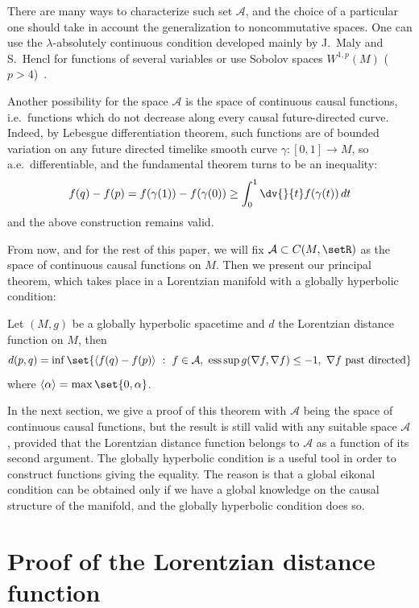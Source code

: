 There are many ways to characterize such set $\mathcal A$, and the choice of a particular one should take in account the generalization to noncommutative spaces. One can use the $\lambda$-absolutely continuous condition developed mainly by J.~Maly and S.~Hencl for functions of several variables or use Sobolov spaces $W^{1,p}(M)$ ($p>4$)~\cite{Hen,Mal}.

Another possibility for the space $\mathcal A$ is the space of continuous causal functions, i.e.\ functions which do not decrease along every causal future-directed curve. Indeed, by Lebesgue dif\/ferentiation theorem, such functions are of bounded variation on any future directed timelike smooth curve $\gamma : [0,1] \rightarrow M$, so a.e.\ dif\/ferentiable, and the fundamental theorem turns to be an inequality:
\[
f(q) - f(p) = f(\gamma(1)) - f(\gamma(0)) \geq \int_0^1 \dv{}{t} f(\gamma(t)) \, dt
\]
and the above construction remains valid.

From now, and for the rest of this paper, we will f\/ix $\mathcal A \subset C(M,\setR)$ as the space of continuous causal functions on $M$. Then we present our principal theorem, which takes place in a Lorentzian manifold with a globally hyperbolic condition:

\begin{theorem}\label{mainth}
Let $(M,g)$ be a globally hyperbolic spacetime and $d$ the Lorentzian distance function on $M$, then
\[
d(p,q) = \inf\set{ \langle f(q)-f(p) \rangle \ :\  f \in \mathcal A,\  \text{\rm ess} \sup g( \nabla f, \nabla f ) \leq -1, \ \nabla f \text{ past directed}}
\]
where $\langle \alpha \rangle = \max\set{0,\alpha}$.

\end{theorem}

In the next section, we give a proof of this theorem with $\mathcal A$ being the space of continuous causal functions, but the result is still valid with any suitable space $\mathcal A$, provided that the Lorentzian distance function belongs to $\mathcal A$ as a function of its second argument. The globally hyperbolic condition is a useful tool in order to construct functions giving the equality. The reason is that a global eikonal condition can be obtained only if we have a global knowledge on the causal structure of the manifold, and the globally hyperbolic condition does so.


\section{Proof of the Lorentzian distance function}


